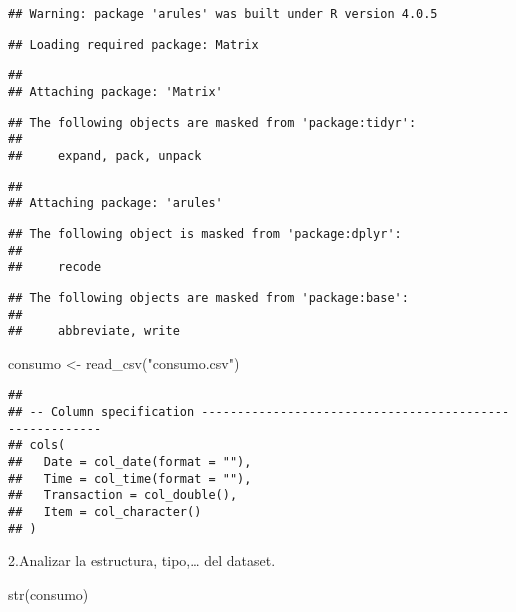 \documentclass[
]{book}
\newenvironment{Shaded}{\begin{snugshade}}{\end{snugshade}}
\newcommand{\FunctionTok}[1]{\textcolor[rgb]{0.00,0.00,0.00}{#1}}
\newcommand{\NormalTok}[1]{#1}
\newcommand{\OtherTok}[1]{\textcolor[rgb]{0.56,0.35,0.01}{#1}}
\newcommand{\StringTok}[1]{\textcolor[rgb]{0.31,0.60,0.02}{#1}}
\begin{document}
\begin{verbatim}
## Warning: package 'arules' was built under R version 4.0.5
\end{verbatim}

\begin{verbatim}
## Loading required package: Matrix
\end{verbatim}

\begin{verbatim}
## 
## Attaching package: 'Matrix'
\end{verbatim}

\begin{verbatim}
## The following objects are masked from 'package:tidyr':
## 
##     expand, pack, unpack
\end{verbatim}

\begin{verbatim}
## 
## Attaching package: 'arules'
\end{verbatim}

\begin{verbatim}
## The following object is masked from 'package:dplyr':
## 
##     recode
\end{verbatim}

\begin{verbatim}
## The following objects are masked from 'package:base':
## 
##     abbreviate, write
\end{verbatim}

\begin{Shaded}
\begin{Highlighting}[]
\NormalTok{consumo }\OtherTok{\textless{}{-}} \FunctionTok{read\_csv}\NormalTok{(}\StringTok{"consumo.csv"}\NormalTok{)}
\end{Highlighting}
\end{Shaded}

\begin{verbatim}
## 
## -- Column specification --------------------------------------------------------
## cols(
##   Date = col_date(format = ""),
##   Time = col_time(format = ""),
##   Transaction = col_double(),
##   Item = col_character()
## )
\end{verbatim}

2.Analizar la estructura, tipo,\ldots{} del dataset.

\begin{Shaded}
\begin{Highlighting}[]
\FunctionTok{str}\NormalTok{(consumo)}
\end{Highlighting}
\end{Shaded}
\end{document}
